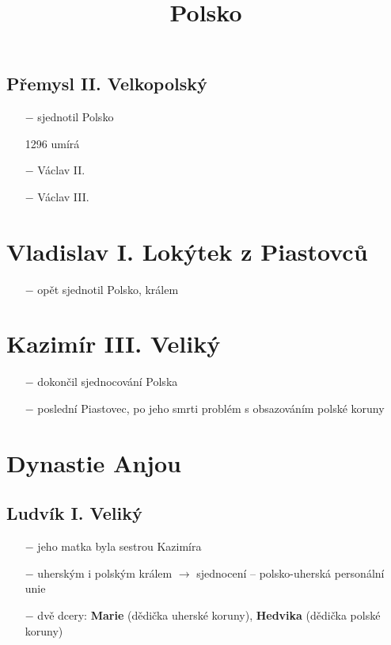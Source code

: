 \documentclass{article}
\title{\vspace{-2cm}Polsko\vspace{-1.7cm}}
\date{}
\author{}
\begin{document}
\maketitle

\subsection*{Přemysl II. Velkopolský}
\begin{itemize}
    \vspace{-0.5em}
    \setlength\itemsep{0.15em}
    \item[$-$] sjednotil Polsko
    \item[1296] umírá
\end{itemize}

\begin{itemize}
    \vspace{-0.5em}
    \setlength\itemsep{0.15em}
    \item[$-$] Václav II.
    \item[$-$] Václav III.
\end{itemize}

\section*{Vladislav I. Lokýtek z Piastovců}
\begin{itemize}
    \vspace{-0.5em}
    \setlength\itemsep{0.15em}
    \item[$-$] opět sjednotil Polsko, králem
\end{itemize}

\section*{Kazimír III. Veliký}
\begin{itemize}
    \vspace{-0.5em}
    \setlength\itemsep{0.15em}
    \item[$-$] dokončil sjednocování Polska
    \item[$-$] poslední Piastovec, po jeho smrti problém s obsazováním polské koruny
\end{itemize}

\section*{Dynastie Anjou}
\subsection*{Ludvík I. Veliký}
\begin{itemize}
    \vspace{-0.5em}
    \setlength\itemsep{0.15em}
    \item[$-$] jeho matka byla sestrou Kazimíra
    \item[$-$] uherským i polským králem $\rightarrow$ sjednocení -- polsko-uherská personální unie
    \item[$-$] dvě dcery: \textbf{Marie} (dědička uherské koruny), \textbf{Hedvika} (dědička polské koruny)
\end{itemize}
\end{document}
